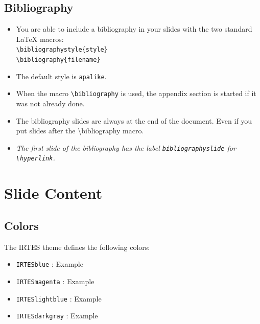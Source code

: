 \documentclass[english,circlenumberstyle]{irtesbeamer}
\begin{document}
\subsection{Bibliography}
\begin{frame}{\subsecname}
	\begin{itemize}
	\item You are able to include a bibliography in your slides with the two standard {\LaTeX} macros: \\
		\texttt{{\textbackslash}bibliographystyle\{style\}} \\
		\texttt{{\textbackslash}bibliography\{filename\}}
	\item The default style is \texttt{apalike}.
	\item When the macro \texttt{{\textbackslash}bibliography} is used, the appendix section is started if it was not already done.
	\item The bibliography slides are \alert{always} at the end of the document. Even if you put slides after the {\textbackslash}bibliography macro.
	\item \emph{The first slide of the bibliography has the label \texttt{bibliographyslide} for \texttt{{\textbackslash}hyperlink}.}
	\end{itemize}
\end{frame}

\section{Slide Content}

\subsection{Colors}
\begin{frame}{\subsecname}
	The IRTES theme defines the following colors:
	\begin{itemize}
	\item \texttt{IRTESblue} : \textcolor{IRTESblue}{Example}
	\item \texttt{IRTESmagenta} : \textcolor{IRTESmagenta}{Example}
	\item \texttt{IRTESlightblue} : \textcolor{IRTESlightblue}{Example}
	\item \texttt{IRTESdarkgray} : \textcolor{IRTESdarkgray}{Example}
	\end{itemize}
\end{frame}
\end{document}
